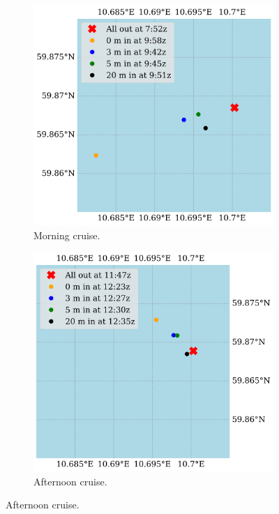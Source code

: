 \documentclass[a4paper,10pt,english]{article}
\begin{document}
\begin{figure}[H]
    \begin{subfigure}{0.5\textwidth}
            \centering
            \includegraphics[width=1.\linewidth]{../figures/drifters/drifters_tokt1.png}
            \caption{Morning cruise.}
            \label{fig:drifter_1}
    \end{subfigure}%
    \begin{subfigure}{0.5\textwidth}
            \centering
            \includegraphics[width=1.\linewidth]{../figures/drifters/drifters_tokt2.png}
            \caption{Afternoon cruise.}
            \label{fig:drifter_2}
    \end{subfigure}
    

\end{figure}
\end{document}
